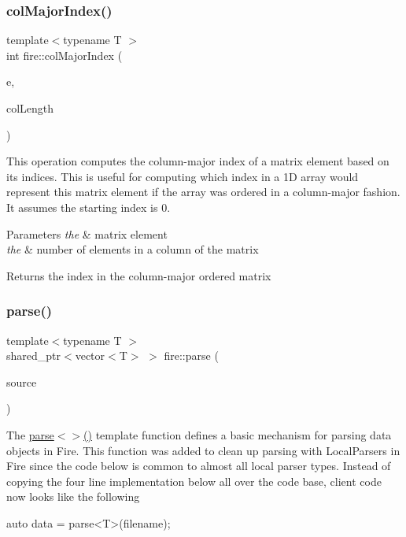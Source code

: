 \subsubsection{\texorpdfstring{col\+Major\+Index()}{colMajorIndex()}\hspace{0.1cm}{\footnotesize\ttfamily [2/2]}}
{\footnotesize\ttfamily template$<$typename T $>$ \\
int fire\+::col\+Major\+Index (\begin{DoxyParamCaption}\item[{\hyperlink{a00189_a1a12603621e7a1efa59ac5cb79f9d509}{Matrix\+Element}$<$ T $>$}]{e,  }\item[{int}]{col\+Length }\end{DoxyParamCaption})\hspace{0.3cm}{\ttfamily [inline]}}

This operation computes the column-\/major index of a matrix element based on its indices. This is useful for computing which index in a 1D array would represent this matrix element if the array was ordered in a column-\/major fashion. It assumes the starting index is 0. 
\begin{DoxyParams}{Parameters}
{\em the} & matrix element \\
\hline
{\em the} & number of elements in a column of the matrix \\
\hline
\end{DoxyParams}
\begin{DoxyReturn}{Returns}
the index in the column-\/major ordered matrix 
\end{DoxyReturn}
\mbox{\label{a00189_a2b47cfd8a5d8711cdc55e1397487b90b}} 
\subsubsection{\texorpdfstring{parse()}{parse()}}
{\footnotesize\ttfamily template$<$typename T $>$ \\
shared\+\_\+ptr$<$vector$<$T$>$ $>$ fire\+::parse (\begin{DoxyParamCaption}\item[{const string \&}]{source }\end{DoxyParamCaption})}

The \hyperlink{a00189_a2b47cfd8a5d8711cdc55e1397487b90b}{parse$<$$>$()} template function defines a basic mechanism for parsing data objects in Fire. This function was added to clean up parsing with Local\+Parsers in Fire since the code below is common to almost all local parser types. Instead of copying the four line implementation below all over the code base, client code now looks like the following 
\begin{DoxyCode}
\textcolor{keyword}{auto} data = parse<T>(filename);
\end{DoxyCode}


